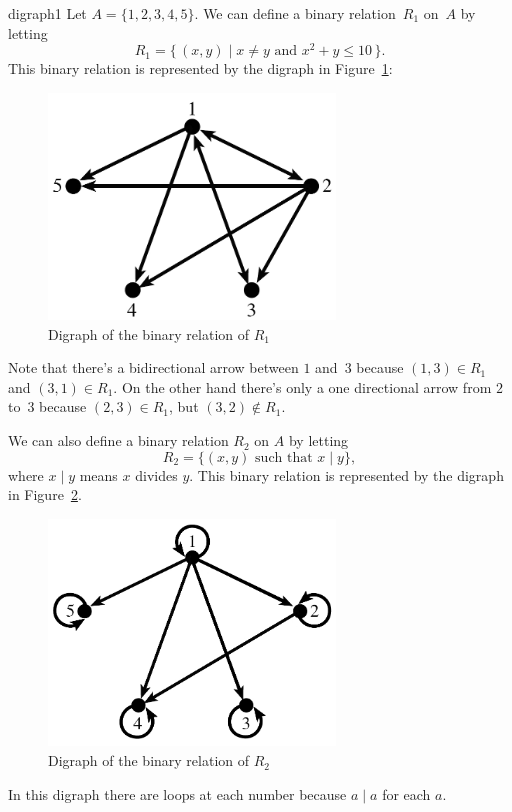  \begin{example}{digraph1}
 Let $A =  \{1,2,3,4,5\}$. We can define a binary relation~$R_1$ on~$A$ by letting
 	\[ R_1 = \{\, (x,y) \mid x \neq y \text{ and } x^2 + y \leq 10 \,\} .\]
This binary relation is represented by the digraph in Figure~\ref{fig:x2y}:
\begin{figure}[htbp]
\begin{center}
\includegraphics[width=3in]{images/x2+y.png}
\caption{Digraph of the binary relation of $R_1$}\label{fig:x2y}
\end{center}
\end{figure}

Note that there's a bidirectional arrow between $1$ and~$3$ because $(1,3) \in R_1$ and $(3,1) \in R_1$. On the other hand there's only a one directional arrow from $2$ to~$3$ because $(2,3) \in R_1$, but $(3,2) \notin R_1$.

We can also define a binary relation $R_2$ on $A$ by letting
$$R_2=\{(x,y) \text{ such that } x\mid y\},$$
where $x\mid y$ means $x$ divides $y$. This binary relation is represented by the digraph in Figure~\ref{fig:xdividesy}.
\begin{figure}[htbp]
\begin{center}
\includegraphics[width=3in]{images/xdividesy.png}
\caption{Digraph of the binary relation of $R_2$}\label{fig:xdividesy}
\end{center}
\end{figure}

In this digraph there are loops at each number because $a \mid a$ for each $a$.

\end{example}

